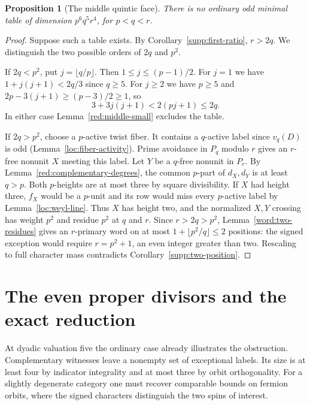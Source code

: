 \documentclass[11pt,a4paper]{article}
\numberwithin{equation}{section}
\newtheorem{proposition}[theorem]{Proposition}
\begin{document}
\begin{proposition}[The middle quintic face]\label{red:middle-quintic}
There is no ordinary odd minimal table of dimension
\(p^6q^5r^4\), for \(p<q<r\).
\end{proposition}
\begin{proof}
Suppose such a table exists. By Corollary~\ref{supp:first-ratio},
$r>2q$. We distinguish the two possible orders of $2q$ and $p^2$.

If $2q<p^2$, put $j=\lfloor q/p\rfloor$. Then
$1\le j\le(p-1)/2$. For $j=1$ we have $1+j(j+1)<2q/3$ since
$q\ge5$. For $j\ge2$ we have $p\ge5$ and
$2p-3(j+1)\ge(p-3)/2\ge1$, so
\[
 3+3j(j+1)<2(pj+1)\le2q.
\]
In either case Lemma~\ref{red:middle-small} excludes the table.

If $2q>p^2$, choose a $p$-active twist fiber. It contains a
$q$-active label since $v_q(D)$ is odd
(Lemma~\ref{loc:fiber-activity}). Prime avoidance in $P_q$ modulo $r$
gives an $r$-free nonunit $X$ meeting this label. Let $Y$ be a
$q$-free nonunit in $P_r$. By Lemma~\ref{red:complementary-degrees},
the common $p$-part of $d_X,d_Y$ is at least $q>p$.
Both $p$-heights are at most three by square divisibility.
If $X$ had height three, $f_X$ would be a $p$-unit and its row would
miss every $p$-active label by Lemma~\ref{loc:weyl-line}.
Thus $X$ has height two, and the normalized $X,Y$ crossing has
weight $p^2$ and residue $p^2$ at $q$ and $r$. Since $r>2q>p^2$,
Lemma~\ref{word:two-residues} gives an $r$-primary word on at most
$1+\lfloor p^2/q\rfloor\le2$ positions: the signed exception
would require $r=p^2+1$, an even integer greater than two.
Rescaling to full character mass contradicts
Corollary~\ref{supp:two-position}.
\end{proof}

\section{The even proper divisors and the exact reduction}\label{sec:even-faces}
\label{red:dyadic-faces}

At dyadic valuation five the ordinary case already illustrates the obstruction.
Complementary witnesses leave a nonempty set of exceptional labels. Its size is at least
four by indicator integrality and at most three by orbit orthogonality.
For a slightly degenerate category one must recover comparable bounds on
fermion orbits, where the signed characters distinguish the two spins of interest.
\end{document}
